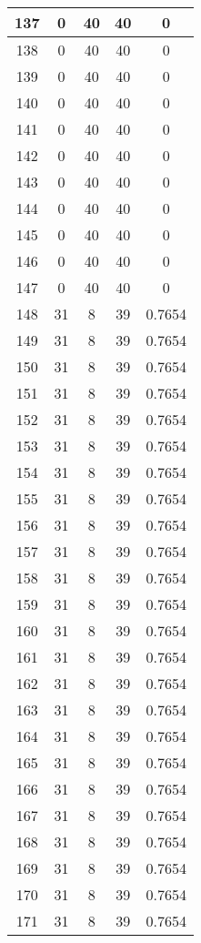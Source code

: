 \documentclass[letterpaper, 12pt]{article}
\begin{document}
\begin{longtable}{|c|c|c|c|c|}
\hline
137 & 0 & 40 & 40 & 0 \\
\hline
138 & 0 & 40 & 40 & 0 \\
\hline
139 & 0 & 40 & 40 & 0 \\
\hline
140 & 0 & 40 & 40 & 0 \\
\hline
141 & 0 & 40 & 40 & 0 \\
\hline
142 & 0 & 40 & 40 & 0 \\
\hline
143 & 0 & 40 & 40 & 0 \\
\hline
144 & 0 & 40 & 40 & 0 \\
\hline
145 & 0 & 40 & 40 & 0 \\
\hline
146 & 0 & 40 & 40 & 0 \\
\hline
147 & 0 & 40 & 40 & 0 \\
\hline
148 & 31 & 8 & 39 & 0.7654 \\
\hline
149 & 31 & 8 & 39 & 0.7654 \\
\hline
150 & 31 & 8 & 39 & 0.7654 \\
\hline
151 & 31 & 8 & 39 & 0.7654 \\
\hline
152 & 31 & 8 & 39 & 0.7654 \\
\hline
153 & 31 & 8 & 39 & 0.7654 \\
\hline
154 & 31 & 8 & 39 & 0.7654 \\
\hline
155 & 31 & 8 & 39 & 0.7654 \\
\hline
156 & 31 & 8 & 39 & 0.7654 \\
\hline
157 & 31 & 8 & 39 & 0.7654 \\
\hline
158 & 31 & 8 & 39 & 0.7654 \\
\hline
159 & 31 & 8 & 39 & 0.7654 \\
\hline
160 & 31 & 8 & 39 & 0.7654 \\
\hline
161 & 31 & 8 & 39 & 0.7654 \\
\hline
162 & 31 & 8 & 39 & 0.7654 \\
\hline
163 & 31 & 8 & 39 & 0.7654 \\
\hline
164 & 31 & 8 & 39 & 0.7654 \\
\hline
165 & 31 & 8 & 39 & 0.7654 \\
\hline
166 & 31 & 8 & 39 & 0.7654 \\
\hline
167 & 31 & 8 & 39 & 0.7654 \\
\hline
168 & 31 & 8 & 39 & 0.7654 \\
\hline
169 & 31 & 8 & 39 & 0.7654 \\
\hline
170 & 31 & 8 & 39 & 0.7654 \\
\hline
171 & 31 & 8 & 39 & 0.7654 \\

\end{longtable}
\end{document}

